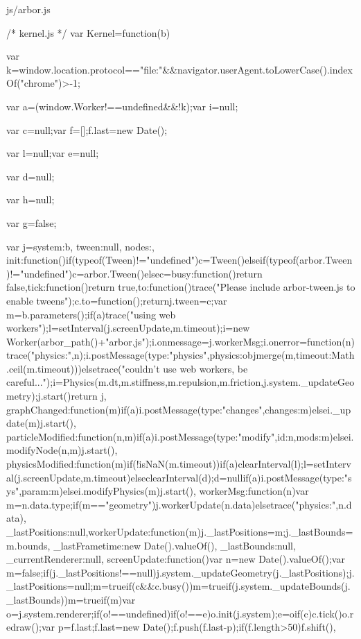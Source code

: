 \documentclass{article}
\begin{document}
\begin{chunk}{js/arbor.js}

  /*     kernel.js */ 
 var Kernel=function(b){
  var k=window.location.protocol=="file:"&&navigator.userAgent.toLowerCase().indexOf("chrome")>-1;

 var a=(window.Worker!==undefined&&!k);var i=null;

 var c=null;var f=[];f.last=new Date();

 var l=null;var e=null;

 var d=null;

 var h=null;

 var g=false;

 var j={system:b, 
        tween:null,
        nodes:{},
        init:function(){if(typeof(Tween)!="undefined"){c=Tween()}else{if(typeof(arbor.Tween)!="undefined"){c=arbor.Tween()}else{c={busy:function(){return false},tick:function(){return true},to:function(){trace("Please include arbor-tween.js to enable tweens");c.to=function(){};return}}}}j.tween=c;var m=b.parameters();if(a){trace("using web workers");l=setInterval(j.screenUpdate,m.timeout);i=new Worker(arbor_path()+"arbor.js");i.onmessage=j.workerMsg;i.onerror=function(n){trace("physics:",n)};i.postMessage({type:"physics",physics:objmerge(m,{timeout:Math.ceil(m.timeout)})})}else{trace("couldn't use web workers, be careful...");i=Physics(m.dt,m.stiffness,m.repulsion,m.friction,j.system._updateGeometry);j.start()}return j},
        graphChanged:function(m){if(a){i.postMessage({type:"changes",changes:m})}else{i._update(m)}j.start()},
        particleModified:function(n,m){if(a){i.postMessage({type:"modify",id:n,mods:m})}else{i.modifyNode(n,m)}j.start()},
        physicsModified:function(m){if(!isNaN(m.timeout)){if(a){clearInterval(l);l=setInterval(j.screenUpdate,m.timeout)}else{clearInterval(d);d=null}}if(a){i.postMessage({type:"sys",param:m})}else{i.modifyPhysics(m)}j.start()},
        workerMsg:function(n){var m=n.data.type;if(m=="geometry"){j.workerUpdate(n.data)}else{trace("physics:",n.data)}},
        _lastPositions:null,workerUpdate:function(m){j._lastPositions=m;j._lastBounds=m.bounds},
        _lastFrametime:new Date().valueOf(),
        _lastBounds:null,
        _currentRenderer:null,
        screenUpdate:function(){var n=new Date().valueOf();var m=false;if(j._lastPositions!==null){j.system._updateGeometry(j._lastPositions);j._lastPositions=null;m=true}if(c&&c.busy()){m=true}if(j.system._updateBounds(j._lastBounds)){m=true}if(m){var o=j.system.renderer;if(o!==undefined){if(o!==e){o.init(j.system);e=o}if(c){c.tick()}o.redraw();var p=f.last;f.last=new Date();f.push(f.last-p);if(f.length>50){f.shift()}}}},
}}
\end{chunk}
\end{document}
